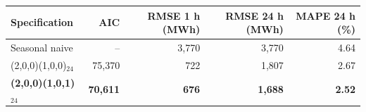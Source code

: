 \begin{tabular}{lrrrr}
\toprule
Specification & AIC & RMSE 1 h (MWh) & RMSE 24 h (MWh) & MAPE 24 h (\%) \\
\midrule
Seasonal naive & -- & 3,770 & 3,770 & 4.64 \\
(2,0,0)(1,0,0)$_{24}$ & 75,370 & 722 & 1,807 & 2.67 \\
\textbf{(2,0,0)(1,0,1)$_{24}$} & \textbf{70,611} & \textbf{676} & \textbf{1,688} & \textbf{2.52} \\
\bottomrule
\end{tabular}
